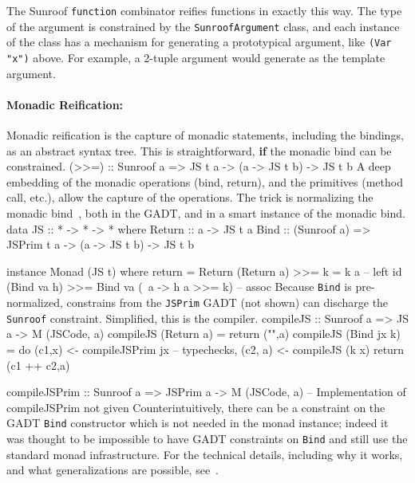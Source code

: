 \documentclass{llncs}
\newcommand{\Src}[1]{{\tt{#1}}}
\newenvironment{Code}{\verbatim}{\endverbatim}
\begin{document}
The Sunroof \Src{function} combinator reifies functions in exactly this way.
The type of the argument is constrained by the \Src{SunroofArgument} class,
and each instance of the class has a mechanism for generating a prototypical
argument, like \Src{(Var "x")} above. For example, a 2-tuple argument
would generate \linebreak\Src{(Var "x",Var "y")} as the template argument.

\paragraph{Monadic Reification:}

Monadic reification is the capture of monadic statements, including the bindings,
as an abstract syntax tree. This is straightforward, {\bf if\/} the monadic bind
can be constrained.
\begin{Code}
(>>=) :: Sunroof a => JS t a -> (a -> JS t b) -> JS t b
\end{Code}
A deep embedding of the monadic operations (bind, return), and the primitives
(method call, etc.), allow the capture of the operations.
The trick is normalizing the monadic
bind~\cite{Sculthorpe:13:ConstrainedMonads,Svenningsson:13:CompositionalMonadReification},
both in the GADT, and in a smart instance of the monadic bind.
\begin{Code}
data JS :: * -> * -> * where
  Return :: a -> JS t a
  Bind :: (Sunroof a) => JSPrim t a -> (a -> JS t b) -> JS t b

instance Monad (JS t) where
  return = Return
  (Return a) >>= k = k a                        -- left id
  (Bind va h) >>= Bind va (\ a -> h a >>= k)    -- assoc
\end{Code}  
Because \Src{Bind} is pre-normalized, constrains from the
\Src{JSPrim} GADT (not shown) can discharge the \Src{Sunroof} constraint.
Simplified, this is the compiler.
\begin{Code}
compileJS :: Sunroof a => JS a -> M (JSCode, a)
compileJS (Return a) = return ("",a) 
compileJS (Bind jx k) = do
   (c1,x)  <- compileJSPrim jx -- typechecks, 
   (c2, a) <- compileJS (k x)
   return (c1 ++ c2,a)

compileJSPrim :: Sunroof a => JSPrim a -> M (JSCode, a)
-- Implementation of compileJSPrim not given
\end{Code}
Counterintuitively, there can be a constraint on the GADT 
\Src{Bind} constructor which is not needed in the monad instance; indeed
it was thought to be impossible to have GADT constraints on
\Src{Bind} and still use the standard monad infrastructure.
For the technical details, including why it works, and what
generalizations are possible, see~\cite{Sculthorpe:13:ConstrainedMonads}.
\end{document}
